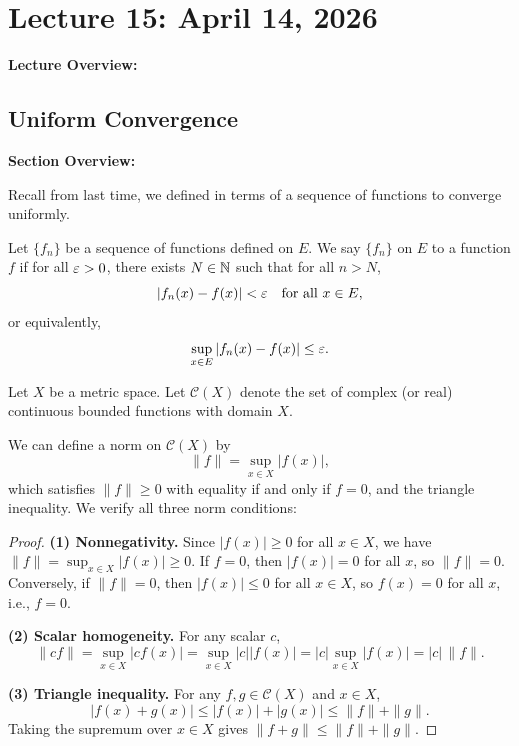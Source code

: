 \documentclass[../master/master.tex]{subfiles}
\begin{document}
\renewcommand{\lecturenum}{15}
\renewcommand{\lecturedate}{April 14, 2026}
\renewcommand{\lecturetopic}{Sequences of Functions}

\section{Lecture \lecturenum : \lecturedate}

\begin{lecturesummary}
\textbf{Lecture Overview:}
\end{lecturesummary}

\subsection{Uniform Convergence}

\begin{summarybox}
\textbf{Section Overview:}
\end{summarybox}

Recall from last time, we defined  in terms of a sequence of functions to converge uniformly.

\begin{definition}
Let $\{f_n\}$ be a sequence of functions defined on $E$. We say $\{f_n\}$  on $E$ to a function $f$ if for all $\varepsilon > 0$, there exists $N \in \mathbb{N}$ such that for all $n > N$,
\[
|f_n(x) - f(x)| < \varepsilon \quad \text{for all } x \in E,
\]
or equivalently,
\[
\sup_{x \in E} |f_n(x) - f(x)| \leq \varepsilon.
\]
\end{definition}

\begin{definition}
Let $X$ be a metric space. Let $\mathscr{C}(X)$ denote the set of complex (or real) continuous bounded functions with domain $X$.
\end{definition}

We can define a norm on $\mathscr{C}(X)$ by
\[
\|f\| = \sup_{x \in X} |f(x)|,
\]
which satisfies $\|f\| \geq 0$ with equality if and only if $f = 0$, and the triangle inequality. We verify all three norm conditions:

\begin{proof}
\textbf{(1) Nonnegativity.} Since $|f(x)| \geq 0$ for all $x \in X$, we have $\|f\| = \sup_{x \in X} |f(x)| \geq 0$. If $f = 0$, then $|f(x)| = 0$ for all $x$, so $\|f\| = 0$. Conversely, if $\|f\| = 0$, then $|f(x)| \leq 0$ for all $x \in X$, so $f(x) = 0$ for all $x$, i.e., $f = 0$.

\textbf{(2) Scalar homogeneity.} For any scalar $c$,
\[
\|cf\| = \sup_{x \in X} |cf(x)| = \sup_{x \in X} |c||f(x)| = |c| \sup_{x \in X} |f(x)| = |c|\,\|f\|.
\]

\textbf{(3) Triangle inequality.} For any $f, g \in \mathscr{C}(X)$ and $x \in X$,
\[
|f(x) + g(x)| \leq |f(x)| + |g(x)| \leq \|f\| + \|g\|.
\]
Taking the supremum over $x \in X$ gives $\|f + g\| \leq \|f\| + \|g\|$.
\end{proof}
\end{document}
